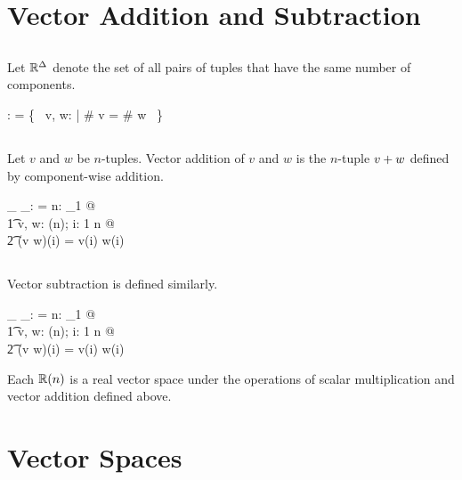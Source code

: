 \documentclass[11pt, oneside]{article}
\begin{document}
\section{Vector Addition and Subtraction}

\subsection{}

Let $\mathbb{R}^\Delta$ denote the set of all pairs of tuples that have the same number of components.

\begin{axdef}
	\Rdelta: \Rinf \rel \Rinf
\where
	\Rdelta = \{~ v, w: \Rinf | \# v = \# w ~\}
\end{axdef}

\subsection{}

Let $v$ and $w$ be $n$-tuples.
Vector addition of $v$ and $w$ is the $n$-tuple $v \mathbin{+} w$ defined by component-wise addition.

\begin{axdef}
	\_ \vaddR \_: \Rdelta \fun \Rinf
\where
	\langle \rangle \vaddR \langle \rangle = \langle \rangle
\also
	\forall n: \nat_1 @ \\
	\t1	\forall v, w: \Rtuples(n); i: 1 \upto n @ \\
	\t2		(v \vaddR w)(i) = v(i) \addR w(i)
\end{axdef}

\subsection{}

Vector subtraction is defined similarly.

\begin{axdef}
	\_ \vsubR \_: \Rdelta \fun \Rinf
\where
	\langle \rangle \vsubR \langle \rangle = \langle \rangle
\also
	\forall n: \nat_1 @ \\
	\t1	\forall v, w: \Rtuples(n); i: 1 \upto n @ \\
	\t2		(v \vsubR w)(i) = v(i) \subR w(i)
\end{axdef}

Each $\mathbb{R}(n)$ is a real vector space under the operations of scalar multiplication and vector addition
defined above. 

\section{Vector Spaces}
\end{document}
